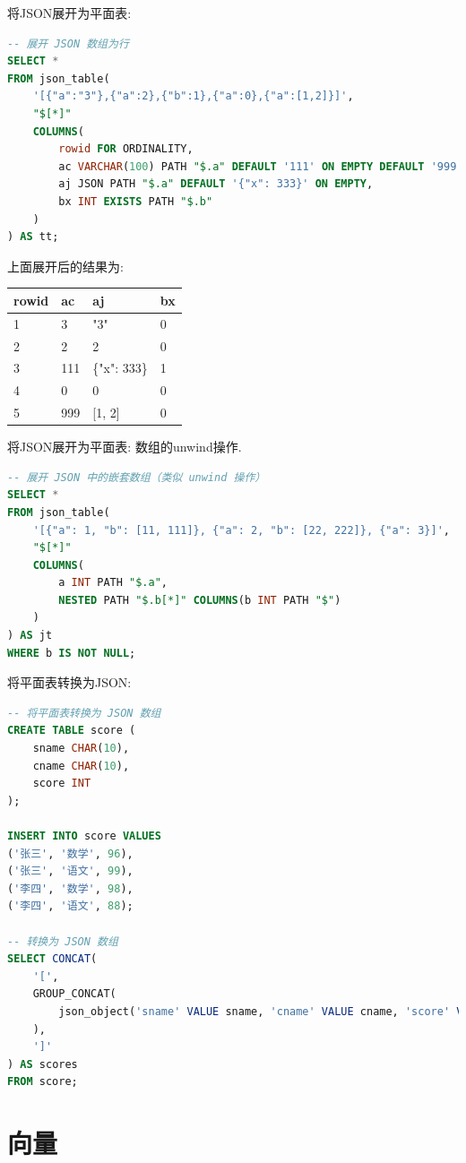 将JSON展开为平面表:
\begin{lstlisting}[language=SQL]
-- 展开 JSON 数组为行
SELECT *
FROM json_table(
    '[{"a":"3"},{"a":2},{"b":1},{"a":0},{"a":[1,2]}]',
    "$[*]"
    COLUMNS(
        rowid FOR ORDINALITY,
        ac VARCHAR(100) PATH "$.a" DEFAULT '111' ON EMPTY DEFAULT '999' ON ERROR,
        aj JSON PATH "$.a" DEFAULT '{"x": 333}' ON EMPTY,
        bx INT EXISTS PATH "$.b"
    )
) AS tt;
\end{lstlisting}
上面展开后的结果为:
\begin{table}[H]
    \centering
    \begin{tabular}{|l|l|l|l|}
        \hline
        rowid & ac & aj & bx \\ \hline
        1 & 3 & "3" & 0 \\ \hline
        2 & 2 & 2 & 0 \\ \hline
        3 & 111 & \{"x": 333\} & 1 \\ \hline
        4 & 0 & 0 & 0 \\ \hline
        5 & 999 & [1, 2] & 0 \\ \hline
    \end{tabular}
\end{table}

将JSON展开为平面表: 数组的unwind操作.
\begin{lstlisting}[language=SQL]
-- 展开 JSON 中的嵌套数组（类似 unwind 操作）
SELECT *
FROM json_table(
    '[{"a": 1, "b": [11, 111]}, {"a": 2, "b": [22, 222]}, {"a": 3}]',
    "$[*]"
    COLUMNS(
        a INT PATH "$.a",
        NESTED PATH "$.b[*]" COLUMNS(b INT PATH "$")
    )
) AS jt
WHERE b IS NOT NULL;
\end{lstlisting}

将平面表转换为JSON:
\begin{lstlisting}[language=SQL]
-- 将平面表转换为 JSON 数组
CREATE TABLE score (
    sname CHAR(10),
    cname CHAR(10),
    score INT
);

INSERT INTO score VALUES
('张三', '数学', 96),
('张三', '语文', 99),
('李四', '数学', 98),
('李四', '语文', 88);

-- 转换为 JSON 数组
SELECT CONCAT(
    '[',
    GROUP_CONCAT(
        json_object('sname' VALUE sname, 'cname' VALUE cname, 'score' VALUE score)
    ),
    ']'
) AS scores
FROM score;
\end{lstlisting}

\section{向量}

